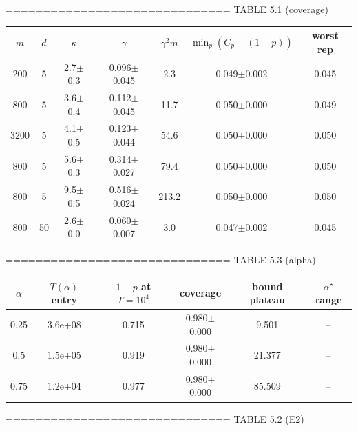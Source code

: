 ============================== TABLE 5.1 (coverage)
\begin{tabular}{|c|c|c|c|c|c|c|}
\hline
$m$ & $d$ & $\kappa$ & $\gamma$ & $\gamma^2 m$ & $\min_p(C_p-(1-p))$ & worst rep \\ \hline
200 & 5 & 2.7$\pm$0.3 & 0.096$\pm$0.045 & 2.3 & 0.049$\pm$0.002 & 0.045 \\
800 & 5 & 3.6$\pm$0.4 & 0.112$\pm$0.045 & 11.7 & 0.050$\pm$0.000 & 0.049 \\
3200 & 5 & 4.1$\pm$0.5 & 0.123$\pm$0.044 & 54.6 & 0.050$\pm$0.000 & 0.050 \\
800 & 5 & 5.6$\pm$0.3 & 0.314$\pm$0.027 & 79.4 & 0.050$\pm$0.000 & 0.050 \\
800 & 5 & 9.5$\pm$0.5 & 0.516$\pm$0.024 & 213.2 & 0.050$\pm$0.000 & 0.050 \\
800 & 50 & 2.6$\pm$0.0 & 0.060$\pm$0.007 & 3.0 & 0.047$\pm$0.002 & 0.045 \\
\hline
\end{tabular}
============================== TABLE 5.3 (alpha)
\begin{tabular}{|c|c|c|c|c|c|}
\hline
$\alpha$ & $T(\alpha)$ entry & $1-p$ at $T{=}10^4$ & coverage & bound plateau & $\alpha^\star$ range \\ \hline
0.25 & 3.6e+08 & 0.715 & 0.980$\pm$0.000 & 9.501 & -- \\
0.5 & 1.5e+05 & 0.919 & 0.980$\pm$0.000 & 21.377 & -- \\
0.75 & 1.2e+04 & 0.977 & 0.980$\pm$0.000 & 85.509 & -- \\
\hline
\end{tabular}
============================== TABLE 5.2 (E2)
